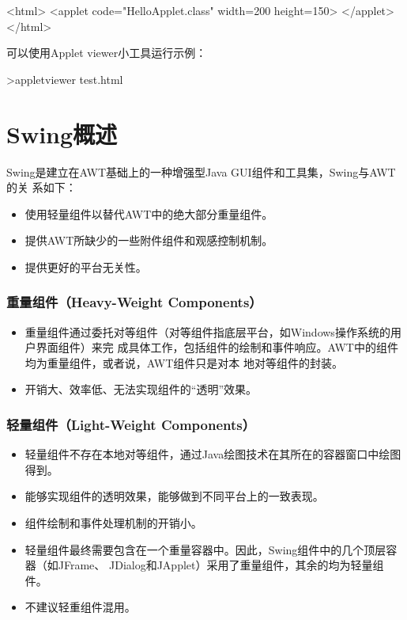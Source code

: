 
\begin{shCode}
  <html>
  <applet code="HelloApplet.class" width=200 height=150> </applet>
  </html>  
\end{shCode}

可以使用Applet viewer小工具运行示例：

\begin{shCode}
  >appletviewer test.html
\end{shCode}

\section{Swing概述}

Swing是建立在AWT基础上的一种增强型Java GUI组件和工具集，Swing与AWT的关
系如下：

\begin{itemize}\kai
\item 使用轻量组件以替代AWT中的绝大部分重量组件。
\item 提供AWT所缺少的一些附件组件和观感控制机制。
\item 提供更好的平台无关性。
\end{itemize}


\subsubsection{重量组件（Heavy-Weight Components）}

\begin{itemize}
\item 重量组件通过委托对等组件（对等组件指底层平台，如Windows操作系统的用户界面组件）来完
  成具体工作，包括组件的绘制和事件响应。AWT中的组件均为重量组件，或者说，AWT组件只是对本
  地对等组件的封装。
\item 开销大、效率低、无法实现组件的“透明”效果。
\end{itemize}

\subsubsection{轻量组件（Light-Weight Components）}

\begin{itemize}
\item 轻量组件不存在本地对等组件，通过Java绘图技术在其所在的容器窗口中绘图得到。
\item 能够实现组件的透明效果，能够做到不同平台上的一致表现。
\item 组件绘制和事件处理机制的开销小。
\item 轻量组件最终需要包含在一个重量容器中。因此，Swing组件中的几个顶层容器（如JFrame、
  JDialog和JApplet）采用了重量组件，其余的均为轻量组件。
\item 不建议轻重组件混用。
\end{itemize}

